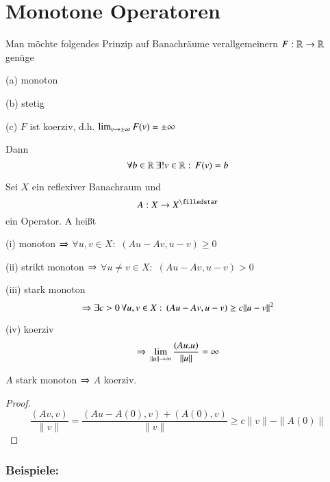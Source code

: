 \section{Monotone Operatoren}

Man möchte folgendes Prinzip auf Banachräume verallgemeinern $F:\mathbb{R}\rightarrow\mathbb{R}$ genüge
\begin{description}
    \item{(a)}
    monoton
    \item{(b)}
    stetig
    \item{(c)}
    $F$ ist koerziv, d.h. $\lim_{v\rightarrow \pm \infty} F(v)=\pm \infty$
\end{description}
Dann
\[
    \forall b\in \mathbb{R} \, \exists ! v\in \mathbb{R}: \, F(v)=b
\]

\begin{defi}\label{4.1}
    Sei $X$ ein reflexiver Banachraum und
    \[
        A:X\ra X^\star
    \]
    ein Operator. A heißt
    \begin{description}
        \item{(i)}
        monoton $\Rightarrow$ $\forall u,v\in X:$ $(Au-Av,u-v)\geq 0$
        \item{(ii)}
        strikt monoton $\Rightarrow$ $\forall u\neq v\in X:$ $(Au-Av,u-v)>0$
        \item{(iii)}
        stark monoton
        \[
            \Rightarrow \exists c>0 \, \forall u,v\in X:\, (Au-Av,u-v)\geq c\|u-v\|^2
        \]
        \item{(iv)}
        koerziv
        \[
            \Rightarrow \, \lim_{\|u\|\rightarrow \infty}\frac{(Au.u)}{\|u\|}=\infty
        \]
    \end{description}
\end{defi}

\begin{remark}
    $A$ stark monoton $\Rightarrow$ $A$ koerziv.
\end{remark}

\begin{proof}
    \[
        \frac{(Av,v)}{\|v\|}=\frac{ (Au-A(0), v) + (A(0),v) }{\|v\|}\geq c\|v\|-\|A(0)\|
    \]
\end{proof}

\subsubsection*{Beispiele:}

